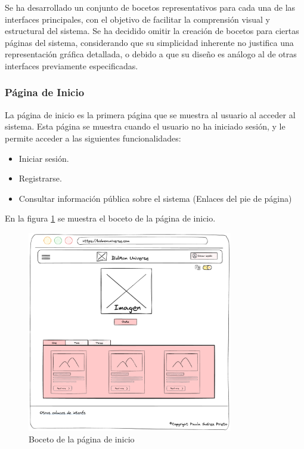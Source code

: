 Se ha desarrollado un conjunto de bocetos representativos para cada una de las interfaces principales, con el objetivo de facilitar la comprensión visual y estructural del sistema. 
Se ha decidido omitir la creación de bocetos para ciertas páginas del sistema, considerando que su simplicidad inherente no justifica una representación gráfica detallada, 
o debido a que su diseño es análogo al de otras interfaces previamente especificadas. 

\subsubsection{Página de Inicio}
La página de inicio es la primera página que se muestra al usuario al acceder al sistema.
Esta página se muestra cuando el usuario no ha iniciado sesión, y le permite acceder a las siguientes funcionalidades:
\begin{itemize}
    \item Iniciar sesión.
    \item Registrarse.
    \item Consultar información pública sobre el sistema (Enlaces del pie de página)
\end{itemize}

En la figura \ref{fig:p_home} se muestra el boceto de la página de inicio.

\begin{figure}[H]
    \centering
    \includegraphics[width=0.8\textwidth]{figures/6-Analisis/6-Interfaz/prototipos/home.png}
    \caption{Boceto de la página de inicio}
    \label{fig:p_home}
\end{figure}

